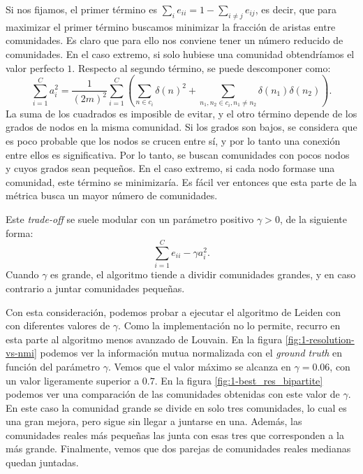 Si nos fijamos, el primer término es $\sum_i e_{ii} = 1 - \sum_{i\neq j}
e_{ij}$, es decir, que para maximizar el primer término buscamos minimizar la
fracción de aristas entre comunidades. Es claro que para ello nos conviene
tener un número reducido de comunidades. En el caso extremo, si solo hubiese una
comunidad obtendríamos el valor perfecto $1$. Respecto al segundo término, se
puede descomponer como:
$$
\sum_{i=1}^C a_i^2 =
\frac{1}{(2m)^2} \sum_{i=1}^C \left( \sum_{n \in c_i} \delta(n)^2 + \sum_{n_1, n_2 \in c_i, n_1 \neq n_2} \delta(n_1) \delta(n_2) \right) 
.$$
La suma de los cuadrados es imposible de evitar, y el otro término depende de
los grados de nodos en la misma comunidad. Si los grados son bajos, se
considera que es poco probable que los nodos se crucen entre sí, y por lo tanto
una conexión entre ellos es significativa. Por lo tanto, se buscan comunidades
con pocos nodos y cuyos grados sean pequeños. En el caso extremo, si cada nodo
formase una comunidad, este término se minimizaría. Es fácil ver entonces que
esta parte de la métrica busca un mayor número de comunidades.

Este \emph{trade-off} se suele modular con un parámetro positivo $\gamma > 0$,
de la siguiente forma:
$$
\sum_{i=1}^C e_{ii} - \gamma a_i^2
.$$
Cuando $\gamma$ es grande, el algoritmo tiende a dividir comunidades grandes, y
en caso contrario a juntar comunidades pequeñas.

Con esta consideración, podemos probar a ejecutar el algoritmo de Leiden con
con diferentes valores de $\gamma$. Como la implementación no lo permite,
recurro en esta parte al algoritmo menos avanzado de Louvain. En la figura
\ref{fig:1-resolution-vs-nmi} podemos ver la información mutua normalizada con
el \emph{ground truth} en función del parámetro $\gamma$. Vemos que el valor
máximo se alcanza en $\gamma = 0.06$, con un valor ligeramente
superior a $0.7$. En la figura \ref{fig:1-best_res_bipartite} podemos ver una
comparación de las comunidades obtenidas con este valor de $\gamma$. En este caso
la comunidad grande se divide en solo tres comunidades, lo cual es una
gran mejora, pero sigue sin llegar a juntarse en una. Además, las comunidades
reales más pequeñas las junta con esas tres que corresponden a la más grande.
Finalmente, vemos que dos parejas de comunidades reales medianas quedan juntadas.

